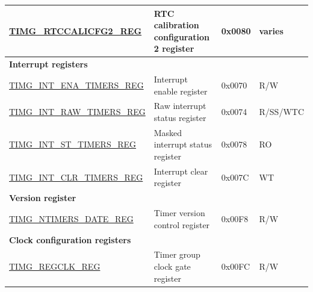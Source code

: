 \begin{longtable}{ | p{5.1cm} | p{7.5cm} | p{1.3cm} | p{1.4cm} | }
    \hyperref[regdesc:TIMGRTCCALICFG2REG]{TIMG\_RTCCALICFG2\_REG} & RTC calibration configuration 2 register & 0x0080 & varies \\ \hline
    \multicolumn{4}{|l|}{\textbf{Interrupt registers}} \\ \hline
    \hyperref[regdesc:TIMGINTENATIMERSREG]{TIMG\_INT\_ENA\_TIMERS\_REG} & Interrupt enable register & 0x0070 & R/W \\ \hline
    \hyperref[regdesc:TIMGINTRAWTIMERSREG]{TIMG\_INT\_RAW\_TIMERS\_REG} & Raw interrupt status register & 0x0074 & R/SS/WTC \\ \hline
    \hyperref[regdesc:TIMGINTSTTIMERSREG]{TIMG\_INT\_ST\_TIMERS\_REG} & Masked interrupt status register & 0x0078 & RO \\ \hline
    \hyperref[regdesc:TIMGINTCLRTIMERSREG]{TIMG\_INT\_CLR\_TIMERS\_REG} & Interrupt clear register & 0x007C & WT \\ \hline
    \multicolumn{4}{|l|}{\textbf{Version register}} \\ \hline
    \hyperref[regdesc:TIMGNTIMERSDATEREG]{TIMG\_NTIMERS\_DATE\_REG} & Timer version control register & 0x00F8 & R/W \\ \hline
    \multicolumn{4}{|l|}{\textbf{Clock configuration registers}} \\ \hline
    \hyperref[regdesc:TIMGREGCLKREG]{TIMG\_REGCLK\_REG} & Timer group clock gate register & 0x00FC & R/W \\ \hline
    \end{longtable}
